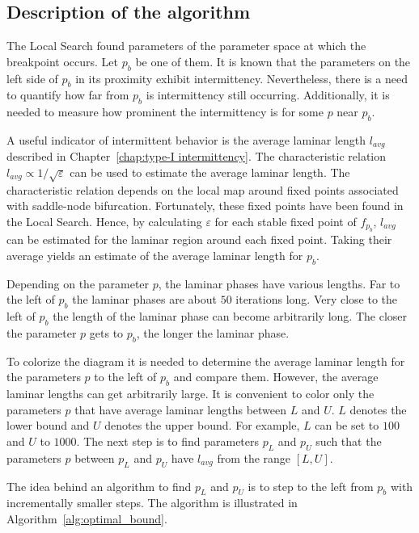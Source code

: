 \subsection{Description of the algorithm}
The Local Search found parameters of the parameter space at which the breakpoint occurs.
Let $p_b$ be one of them.
It is known that the parameters on the left side of $p_b$ in its proximity exhibit intermittency.
Nevertheless, there is a need to quantify how far from $p_b$ is intermittency still occurring.
Additionally, it is needed to measure how prominent the intermittency is for some $p$ near $p_b$.
\par
A useful indicator of intermittent behavior is the average laminar length $l_{avg}$ described in Chapter~\ref{chap:type-I intermittency}.
The characteristic relation $l_{avg} \varpropto 1 / \sqrt{\varepsilon}$ can be used to estimate the average laminar length.
The characteristic relation depends on the local map around fixed points associated with saddle-node bifurcation.
Fortunately, these fixed points have been found in the Local Search.
Hence, by calculating $\varepsilon$ for each stable fixed point of $f_{p_b}$, $l_{avg}$ can be estimated for the laminar region around each fixed point.
Taking their average yields an estimate of the average laminar length for $p_b$.
\par
Depending on the parameter $p$, the laminar phases have various lengths.
Far to the left of $p_b$ the laminar phases are about $50$ iterations long.
Very close to the left of $p_b$ the length of the laminar phase can become arbitrarily long.
The closer the parameter $p$ gets to $p_b$, the longer the laminar phase.
\par
To colorize the diagram it is needed to determine the average laminar length for the parameters $p$ to the left of $p_b$ and compare them.
However, the average laminar lengths can get arbitrarily large.
It is convenient to color only the parameters $p$ that have average laminar lengths between $L$ and $U$. 
$L$ denotes the lower bound and $U$ denotes the upper bound.
For example, $L$ can be set to $100$ and $U$ to $1000$.
The next step is to find parameters $p_L$ and $p_U$ such that the parameters $p$ between $p_L$ and $p_U$ have $l_{avg}$ from the range $[ L, U ]$.
\par
The idea behind an algorithm to find $p_L$ and $p_U$ is to step to the left from $p_b$ with incrementally smaller steps.
The algorithm is illustrated in Algorithm~\ref{alg:optimal_bound}.

